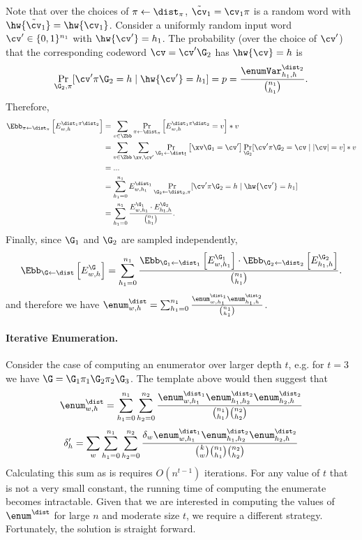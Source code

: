 Note that over the choices of $\pi\gets\dist_\pi$, $\tilde{\cv}_1 = \cv_1\pi$ is a random word with $\hw{\tilde{\cv}_1} = \hw{\cv_1}$. Consider a uniformly random input word ${\cv}' \in \{0,1\}^{n_1}$ with $\hw{{\cv}'} = h_1$. The probability (over the choice of ${\cv}'$) that the corresponding codeword $\cv = {\cv}'\G_2$ has $\hw{\cv} = h$ is
$$
\Pr_{\G_2,\pi}[\cv'\pi\G_2 = h \mid \hw{\cv'}=h_1 ]= p = \frac{\enumVar^{\dist_2}_{h_1,h}}{\binom{n_1}{h_1}}.
$$
Therefore,
\begin{align*}
  \Ebb_{\pi \gets \dist_{\pi}}\left[E^{\dist_1 \pi \dist_2}_{w,h}\right] &=\sum_{v\in \Zbb} \Pr_{\pi \gets \dist_{\pi}}\left[E^{\dist_1 \pi \dist_2}_{w,h} = v\right] * v \\
  &=\sum_{v\in \Zbb} \sum_{\xv,\cv'}\Pr_{\G_1\gets\dist_1}\left[\xv \G_1 = \cv'\right] \Pr_{\G_2}[\cv'\pi\G_2 = \cv \mid |\cv| = v] * v \\
  &=...\\
  &=\sum_{h_1=0}^{n_1} E^{\dist_1}_{w,h_1} \Pr_{\G_2\gets\dist_2,\pi}[\cv'\pi\G_2 = h \mid \hw{\cv'}=h_1 ] \\
  &=\sum_{h_1=0}^{n_1}\frac{E^{\G_1}_{w,h_1}\cdot E^{\G_2}_{h_1,h}}{\binom{n_1}{h_1}}.
\end{align*}
Finally, since $\G_1$ and $\G_2$ are sampled independently,
$$
\Ebb_{\G \gets \dist}\left[E^{\G}_{w,h}\right] = \sum_{h_1=0}^{n_1}\frac{\Ebb_{\G_1 \gets \dist_1}\left[E^{\G_1}_{w,h_1}\right]\cdot \Ebb_{\G_2 \gets \dist_2}\left[E^{\G_2}_{h_1,h}\right]}{\binom{n_1}{h_1}}.
$$
and therefore we have $\enum^\dist_{w,h}=\sum_{h_1=0}^{n_1}\frac{\enum^{\dist_1}_{w,h_1} \enum^{\dist_2}_{h_1,h}}{{n_1\choose h_1}}$.

\paragraph{Iterative Enumeration.} Consider the case of computing an enumerator over larger depth $t$, e.g.  for $t=3$ we have $\G=\G_1\pi_1\G_2\pi_2\G_3$. The template above would then suggest that
$$
\enum^\dist_{w,h}=\sum_{h_1=0}^{n_1}\sum_{h_2=0}^{n_2}\frac{\enum^{\dist_1}_{w,h_1} \enum^{\dist_2}_{h_1,h_2} \enum^{\dist_2}_{h_2,h} }{{n_1\choose h_1}{n_2\choose h_2}}
$$$$
\delta'_{h}=\sum_w\sum_{h_1=0}^{n_1}\sum_{h_2=0}^{n_2}\frac{\delta_w\enum^{\dist_1}_{w,h_1} \enum^{\dist_2}_{h_1,h_2} \enum^{\dist_2}_{h_2,h} }{{k \choose w}{n_1\choose h_1}{n_2\choose h_2}}
$$
Calculating this sum as is requires $O(n^{t-1})$ iterations. For any value of $t$ that is not a very small constant, the running time of computing the enumerate becomes intractable.
Given that we are interested in computing the values of $\enum^\dist$ for large $n$ and moderate size $t$, we require a different strategy. Fortunately, the solution is straight forward.

